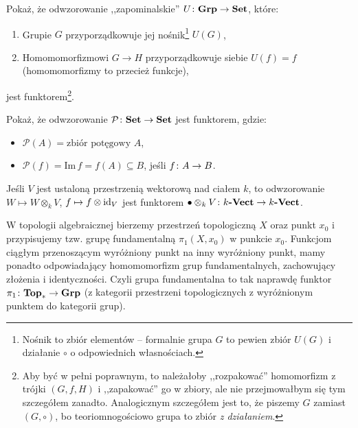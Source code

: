 \begin{exc}
  \label{exc:group_forgetful}
  Pokaż, że odwzorowanie ,,zapominalskie'' $U\colon \textbf{Grp}\to \textbf{Set}$, które:
  \begin{enumerate}
    \item Grupie $G$ przyporządkowuje jej nośnik\footnote{Nośnik to zbiór elementów -- formalnie grupa $G$ to pewien zbiór $U(G)$ i działanie $\circ$ o odpowiednich własnościach.} $U(G)$,
    \item Homomomorfizmowi $G\to H$ przyporządkowuje siebie $U(f)=f$ (homomomorfizmy to przecież funkcje),
  \end{enumerate}
  jest funktorem\footnote{Aby być w pełni poprawnym, to należałoby ,,rozpakować'' homomorfizm z trójki $(G, f, H)$ i ,,zapakować'' go w zbiory, ale nie przejmowałbym się tym szczegółem zanadto. Analogicznym szczegółem jest to, że piszemy $G$ zamiast $(G, \circ)$, bo teoriomnogościowo grupa to zbiór \emph{z działaniem}.}.
\end{exc}

\begin{exc}
  Pokaż, że odwzorowanie $\mathcal P\colon \textbf{Set}\to \textbf{Set}$ jest funktorem, gdzie:
  \begin{itemize}
    \item $\mathcal P(A) = \text{zbiór potęgowy $A$}$,
    \item $\mathcal P(f) = \mathrm{Im}\,f = f(A)\subseteq B$, jeśli $f\colon A\to B$.
  \end{itemize}
\end{exc}

\begin{exmp}
  Jeśli $V$ jest ustaloną przestrzenią wektorową nad ciałem $k$, to odwzorowanie $W\mapsto W\otimes_k V$, $f\mapsto f\otimes \mathrm{id}_{V}$ jest funktorem $\bullet \otimes_k V\colon k\textbf{-Vect}\to k\textbf{-Vect}$.
\end{exmp}

\begin{exmp}
  W topologii algebraicznej bierzemy przestrzeń topologiczną $X$ oraz punkt $x_0$ i przypisujemy tzw. grupę fundamentalną $\pi_1(X, x_0)$ w punkcie $x_0$. Funkcjom ciągłym przenoszącym wyróżniony punkt na inny wyróżniony punkt, mamy ponadto odpowiadający homomomorfizm grup fundamentalnych, zachowujący złożenia i identyczności. Czyli grupa fundamentalna to tak naprawdę funktor $\pi_1\colon \textbf{Top}_*\to \textbf{Grp}$ (z kategorii przestrzeni topologicznych z wyróżnionym punktem do kategorii grup).
\end{exmp}

